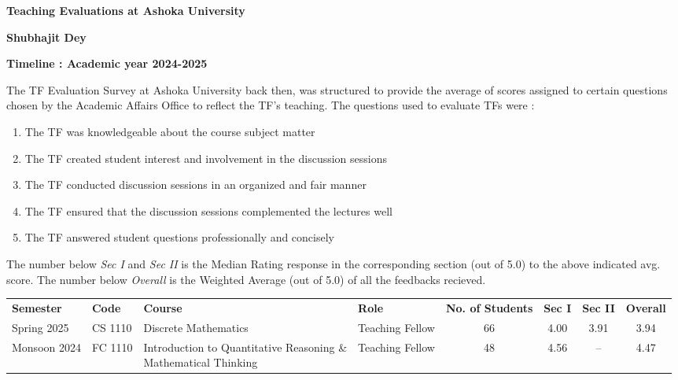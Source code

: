 \documentclass[12pt]{article}
\begin{document}
\begin{center}
    \Large{\textbf{Teaching Evaluations at Ashoka University}}\\
    \medskip

    \large{\textbf{Shubhajit Dey}}
\end{center}

\textbf{Timeline : Academic year 2024-2025}

The TF Evaluation Survey at Ashoka University back then, was structured to provide
the average of scores assigned to certain questions chosen by the Academic Affairs
Office to reflect the TF's teaching. The questions used to evaluate
TFs were :
\begin{enumerate}[noitemsep]
    \item The TF was knowledgeable about the course subject matter
    \item The TF created student interest and involvement in the discussion sessions
    \item The TF conducted discussion sessions in an organized and fair manner
    \item The TF ensured that the discussion sessions complemented the lectures well
    \item The TF answered student questions professionally and concisely
\end{enumerate}
The number below \textit{Sec I} and \textit{Sec II} is the Median Rating response
in the corresponding section (out of 5.0) to the above indicated avg. score. The number
below \textit{Overall} is the Weighted Average (out of 5.0) of all the feedbacks
recieved.
\begin{table}[H]
    \centering
    \begin{tabular}{llllcccc}
        \rowcolor{paynes.gray!20}
        \textbf{Semester} & \textbf{Code}& \textbf{Course} & \textbf{Role} & \textbf{No. of Students} & \textbf{Sec I} & \textbf{Sec II} & \textbf{Overall}\\
        Spring 2025 & CS 1110 & Discrete Mathematics & Teaching Fellow & 66 & 4.00 & 3.91 & 3.94\\
        Monsoon 2024 & FC 1110 &\makecell[l]{Introduction to Quantitative Reasoning \&\\Mathematical Thinking} & Teaching Fellow & 48 & 4.56 & -- & 4.47
    \end{tabular}
\end{table}
\end{document}
